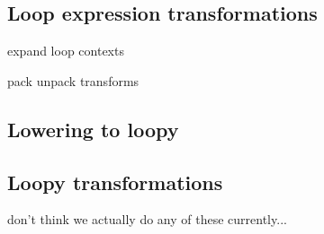 \documentclass[thesis]{subfiles}
\begin{document}
\subsection{Loop expression transformations}

expand loop contexts

pack unpack transforms

\subsection{Lowering to loopy}

\subsection{Loopy transformations}

don't think we actually do any of these currently...

%
%
%
\end{document}
